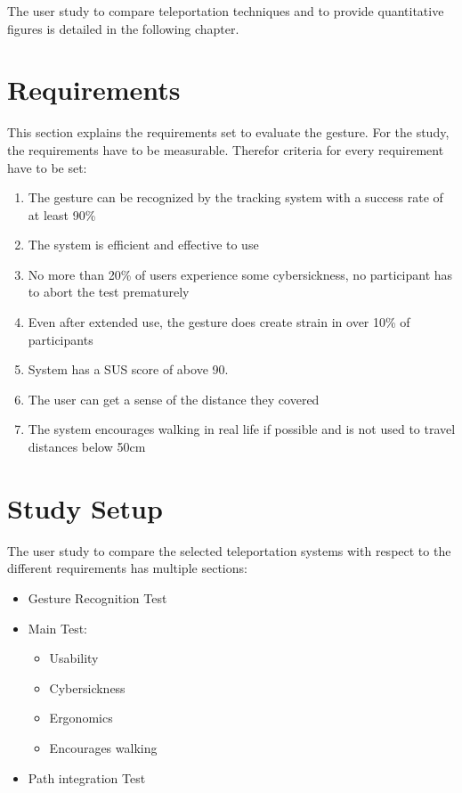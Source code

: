 The user study to compare teleportation techniques and to provide quantitative figures is detailed in the following chapter.


\section{Requirements}
This section explains the requirements set to evaluate the gesture.
For the study, the requirements have to be measurable. Therefor criteria for every requirement have to be set:

\begin{enumerate}
    \item The gesture can be recognized by the tracking system with a success rate of at least 90\%
    \item The system is efficient and effective to use
    \item No more than 20\% of users experience some cybersickness, no participant has to abort the test prematurely
    \item Even after extended use, the gesture does create strain in over 10\% of participants
    \item System has a SUS score of above 90.
    \item The user can get a sense of the distance they covered
    \item The system encourages walking in real life if possible and is not used to travel distances below 50cm
\end{enumerate}


\section{Study Setup}
The user study to compare the selected teleportation systems with respect to the different requirements has multiple sections:
\begin{itemize}
    \item Gesture Recognition Test
    \item Main Test:
    \begin{itemize}
        \item Usability
        \item Cybersickness
        \item Ergonomics
        \item Encourages walking
    \end{itemize}
    \item Path integration Test
\end{itemize}

